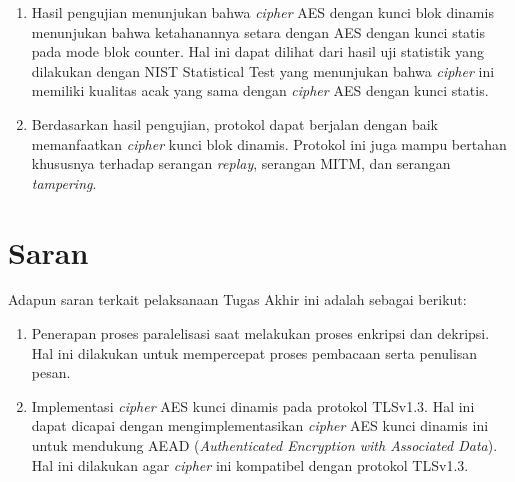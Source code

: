 \begin{enumerate}
  \item Hasil pengujian menunjukan bahwa \emph{cipher} AES dengan kunci blok dinamis menunjukan bahwa ketahanannya setara dengan AES dengan kunci statis pada mode blok counter. Hal ini dapat dilihat dari hasil uji statistik yang dilakukan dengan NIST Statistical Test yang menunjukan bahwa \emph{cipher} ini memiliki kualitas acak yang sama dengan \emph{cipher} AES dengan kunci statis.
  \item Berdasarkan hasil pengujian, protokol dapat berjalan dengan baik memanfaatkan \emph{cipher} kunci blok dinamis. Protokol ini juga mampu bertahan khususnya terhadap serangan \emph{replay}, serangan MITM, dan serangan \emph{tampering}.
\end{enumerate}

\section{Saran}
Adapun saran terkait pelaksanaan Tugas Akhir ini adalah sebagai berikut:
\begin{enumerate}
  \item Penerapan proses paralelisasi saat melakukan proses enkripsi dan dekripsi. Hal ini dilakukan untuk mempercepat proses pembacaan serta penulisan pesan.
  \item Implementasi \emph{cipher} AES kunci dinamis pada protokol TLSv1.3. Hal ini dapat dicapai dengan mengimplementasikan \emph{cipher} AES kunci dinamis ini untuk mendukung AEAD (\emph{Authenticated Encryption with Associated Data}). Hal ini dilakukan agar \emph{cipher} ini kompatibel dengan protokol TLSv1.3.
\end{enumerate}
